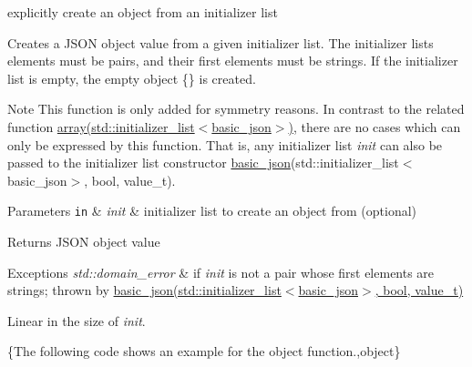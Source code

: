 explicitly create an object from an initializer list 

Creates a J\+S\+ON object value from a given initializer list. The initializer lists elements must be pairs, and their first elements must be strings. If the initializer list is empty, the empty object {\ttfamily \{\}} is created.

\begin{DoxyNote}{Note}
This function is only added for symmetry reasons. In contrast to the related function \hyperlink{classnlohmann_1_1basic__json_a5685815624b086caa532f41e853d4b0f}{array(std\+::initializer\+\_\+list$<$basic\+\_\+json$>$)}, there are no cases which can only be expressed by this function. That is, any initializer list {\itshape init} can also be passed to the initializer list constructor \hyperlink{classnlohmann_1_1basic__json}{basic\+\_\+json}(std\+::initializer\+\_\+list$<$basic\+\_\+json$>$, bool, value\+\_\+t).
\end{DoxyNote}

\begin{DoxyParams}[1]{Parameters}
\mbox{\tt in}  & {\em init} & initializer list to create an object from (optional)\\
\hline
\end{DoxyParams}
\begin{DoxyReturn}{Returns}
J\+S\+ON object value
\end{DoxyReturn}

\begin{DoxyExceptions}{Exceptions}
{\em std\+::domain\+\_\+error} & if {\itshape init} is not a pair whose first elements are strings; thrown by \hyperlink{classnlohmann_1_1basic__json_afeb998aec45296bc2050bd1c41ef41eb}{basic\+\_\+json(std\+::initializer\+\_\+list$<$basic\+\_\+json$>$, bool, value\+\_\+t)}\\
\hline
\end{DoxyExceptions}
Linear in the size of {\itshape init}.

\{The following code shows an example for the {\ttfamily object} function.,object\}


